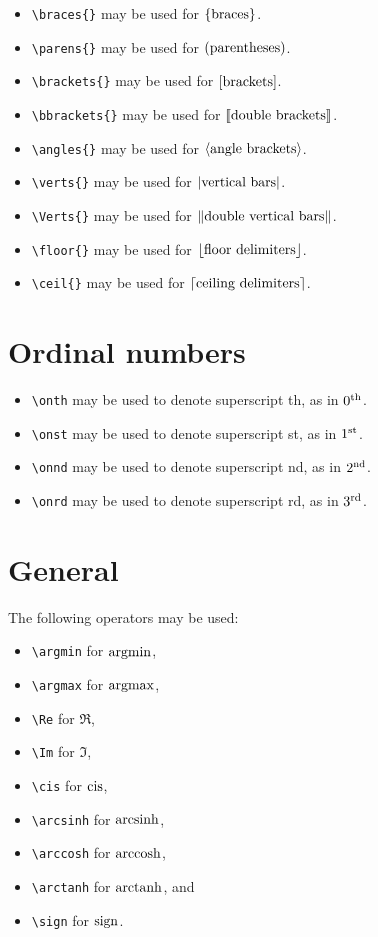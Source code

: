 \documentclass{mszreport}
\begin{document}
\begin{itemize}
    \item \verb|\braces{}| may be used for $\lbrace\text{braces}\rbrace$.
    \item \verb|\parens{}| may be used for $\lparen\text{parentheses}\rparen$.
    \item \verb|\brackets{}| may be used for $\lbrack\text{brackets}\rbrack$.
    \item \verb|\bbrackets{}| may be used for $\llbracket\text{double brackets}\rrbracket$.
    \item \verb|\angles{}| may be used for $\langle\text{angle brackets}\rangle$.
    \item \verb|\verts{}| may be used for $\lvert\text{vertical bars}\rvert$.
    \item \verb|\Verts{}| may be used for $\lVert\text{double vertical bars}\rVert$.
    \item \verb|\floor{}| may be used for $\lfloor\text{floor delimiters}\rfloor$.
    \item \verb|\ceil{}| may be used for $\lceil\text{ceiling delimiters}\rceil$.
\end{itemize}

\section{Ordinal numbers}

\begin{itemize}
    \item \verb|\onth| may be used to denote superscript th, as in $0^{\text{th}}$.
    \item \verb|\onst| may be used to denote superscript st, as in $1^{\text{st}}$.
    \item \verb|\onnd| may be used to denote superscript nd, as in $2^{\text{nd}}$.
    \item \verb|\onrd| may be used to denote superscript rd, as in $3^{\text{rd}}$.
\end{itemize}

\section{General}

The following operators may be used:
\begin{itemize}
    \item \verb|\argmin| for $\operatorname*{argmin}$,
    \item \verb|\argmax| for $\operatorname*{argmax}$,
    \item \verb|\Re| for $\Re$,
    \item \verb|\Im| for $\Im$,
    \item \verb|\cis| for $\operatorname{cis}$,
    \item \verb|\arcsinh| for $\operatorname{arcsinh}$,
    \item \verb|\arccosh| for $\operatorname{arccosh}$,
    \item \verb|\arctanh| for $\operatorname{arctanh}$, and
    \item \verb|\sign| for $\operatorname{sign}$.
\end{itemize}
\end{document}
